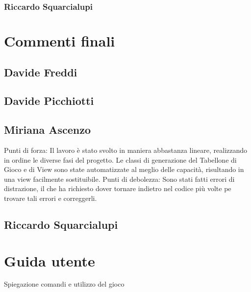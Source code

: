 \documentclass[a4paper,12pt]{report}
\begin{document}
\subsection{Riccardo Squarcialupi}

\chapter{Commenti finali}

\section{Davide Freddi}
\section{Davide Picchiotti}
\section{Miriana Ascenzo}

Punti di forza:
%
Il lavoro è stato svolto in maniera abbastanza lineare, realizzando in ordine le diverse fasi del progetto.
%
Le classi di generazione del Tabellone di Gioco e di View sono state automatizzate al meglio delle capacità, risultando in una view facilmente sostituibile.
Punti di debolezza:
%
Sono stati fatti errori di distrazione, il che ha richiesto dover tornare indietro nel codice più volte pe trovare tali errori e correggerli.


\section{Riccardo Squarcialupi}

\appendix
\chapter{Guida utente}

Spiegazione comandi e utilizzo del gioco
\end{document}
